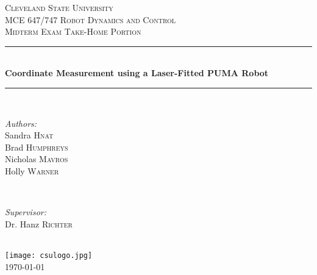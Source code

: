 \documentclass[12pt]{article}
\begin{document}

\begin{titlepage}

\newcommand{\HRule}{\rule{\linewidth}{0.3mm}} 

\center 
 
\textsc{\LARGE Cleveland State University}\\[1.5cm] 
\textsc{\Large MCE 647/747 Robot Dynamics and Control}\\[0.5cm] 
\textsc{\large Midterm Exam Take-Home Portion}\\[0.5cm] 

\HRule \\[0.4cm]
{ \huge \bfseries Coordinate Measurement using a Laser-Fitted PUMA Robot}\\[0.4cm] 
\HRule \\[1.5cm]
 
\begin{minipage}{0.4\textwidth}
\begin{flushleft} \large
\emph{Authors:}\\
Sandra \textsc{Hnat}\\
Brad \textsc{Humphreys}\\
Nicholas \textsc{Mavros}\\
Holly \textsc{Warner}
\end{flushleft}
\end{minipage}
~
\begin{minipage}{0.4\textwidth}
\begin{flushright} \large
\emph{Supervisor:} \\
Dr. Hanz \textsc{Richter} \\
\vspace*{3\baselineskip}
\end{flushright}
\end{minipage}\\[2cm]

\texttt{[image: csulogo.jpg]}\\[0.5cm] 

{\large \today}\\[2cm] 


 

\vfill 

\end{titlepage}
\end{document}
